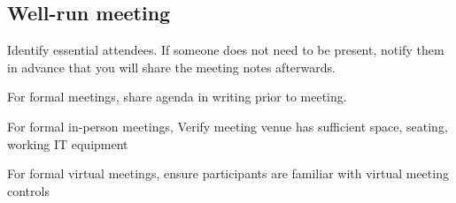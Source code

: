 \subsection{Well-run meeting\label{well-run_meeting}}

Identify essential attendees. If someone does not need to be present, notify them in advance that you will share the meeting notes afterwards. 



For formal meetings, share agenda in writing prior to meeting. 

For formal in-person meetings, Verify meeting venue has sufficient space, seating, working IT equipment

For formal virtual meetings, ensure participants are familiar with virtual meeting controls

